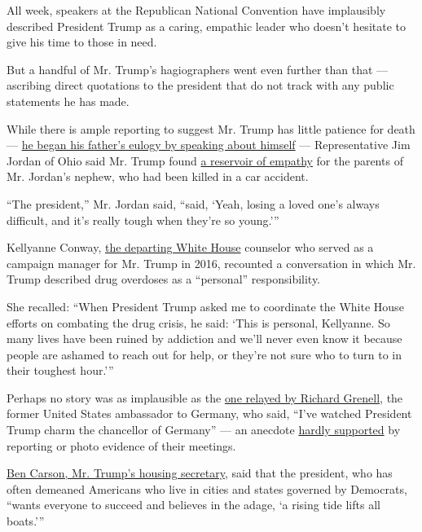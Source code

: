 All week, speakers at the Republican National Convention have
implausibly described President Trump as a caring, empathic leader who
doesn't hesitate to give his time to those in need.

But a handful of Mr. Trump's hagiographers went even further than that
--- ascribing direct quotations to the president that do not track with
any public statements he has made.

While there is ample reporting to suggest Mr. Trump has little patience
for death ---
\href{https://www.nytimes3xbfgragh.onion/2020/07/28/us/politics/donald-fred-trump.html}{he
began his father's eulogy by speaking about himself} --- Representative
Jim Jordan of Ohio said Mr. Trump found
\href{https://www.nytimes3xbfgragh.onion/live/2020/08/24/us/rnc-convention-election/jim-jordan-sought-to-paint-trump-as-empathetic-with-a-personal-story}{a
reservoir of empathy} for the parents of Mr. Jordan's nephew, who had
been killed in a car accident.

``The president,'' Mr. Jordan said, ``said, `Yeah, losing a loved one's
always difficult, and it's really tough when they're so young.'''

Kellyanne Conway,
\href{https://www.nytimes3xbfgragh.onion/live/2020/08/26/us/rnc-convention-election/kellyanne-conway-is-leaving-the-white-house-but-not-the-spotlight}{the
departing White House} counselor who served as a campaign manager for
Mr. Trump in 2016, recounted a conversation in which Mr. Trump described
drug overdoses as a ``personal'' responsibility.

She recalled: ``When President Trump asked me to coordinate the White
House efforts on combating the drug crisis, he said: `This is personal,
Kellyanne. So many lives have been ruined by addiction and we'll never
even know it because people are ashamed to reach out for help, or
they're not sure who to turn to in their toughest hour.'''

Perhaps no story was as implausible as the
\href{https://www.nytimes3xbfgragh.onion/live/2020/08/26/us/rnc-convention-election/richard-grenell-a-former-diplomat-and-intelligence-official-revives-an-unsubstantiated-wiretap-claim}{one
relayed by Richard Grenell}, the former United States ambassador to
Germany, who said, ``I've watched President Trump charm the chancellor
of Germany'' --- an anecdote
\href{https://www.nytimes3xbfgragh.onion/2018/04/27/us/politics/trump-merkel.html}{hardly
supported} by reporting or photo evidence of their meetings.

\href{https://www.nytimes3xbfgragh.onion/live/2020/08/27/us/rnc-convention-election/ben-carson-the-lone-black-person-in-trumps-cabinet-offers-consolation-to-jacob-blakes-family}{Ben
Carson, Mr. Trump's housing secretary}, said that the president, who has
often demeaned Americans who live in cities and states governed by
Democrats, ``wants everyone to succeed and believes in the adage, `a
rising tide lifts all boats.'''

